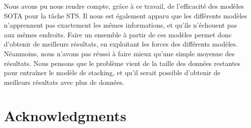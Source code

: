 \documentclass[11pt,a4paper, french]{article}
\begin{document}
Nous avons pu nous rendre compte, grâce à ce travail, de l'efficacité des modèles SOTA pour la tâche STS. Il nous est également apparu que les différents modèles n'apprennent pas exactement les mêmes informations, et qu'ils n'échouent pas aux mêmes endroits. Faire un ensemble à partir de ces modèles permet donc d'obtenir de meilleurs résultats, en exploitant les forces des différents modèles. Néanmoins, nous n'avons pas réussi à faire mieux qu'une simple moyenne des résultats. Nous pensons que le problème vient de la taille des données restantes pour entraîner le modèle de stacking, et qu'il serait possible d'obtenir de meilleurs résultats avec plus de données.

\section*{Acknowledgments}
 




\appendix
\end{document}
